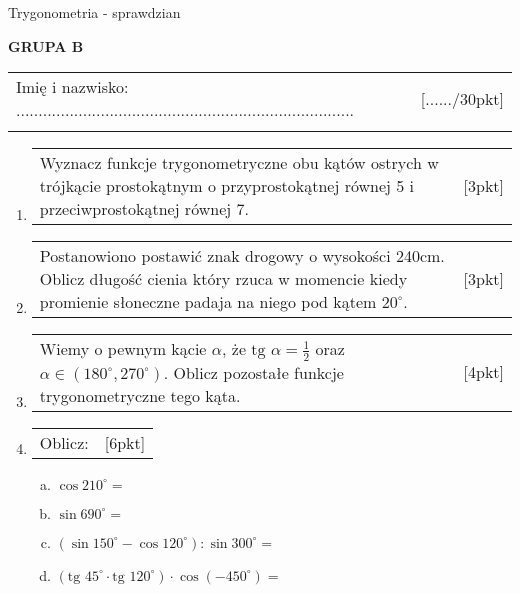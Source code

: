 \documentclass[12pt,a4paper]{article}
\begin{document}
	\begin{center}
		\LARGE Trygonometria - sprawdzian
	\end{center}
	\vspace{1.5cm}
	\begin{flushright}
		\textbf{GRUPA B}
	\end{flushright}
	\begin{tabular}{p{13cm} r}
		Imię i nazwisko: ............................................................................
		&[....../30pkt]\\ 
		\vspace{0.5cm}
	\end{tabular}
	\begin{enumerate}[1.]

		\item  \begin{tabular}{p{13cm} r}
			Wyznacz funkcje trygonometryczne obu kątów ostrych w trójkącie prostokątnym o przyprostokątnej równej 5 i przeciwprostokątnej równej 7. &[3pkt]\\ 
		\end{tabular}
	
		\item  \begin{tabular}{p{13cm} r}
			Postanowiono postawić znak drogowy o wysokości 240cm. Oblicz długość cienia który rzuca w momencie kiedy promienie słoneczne padaja na niego pod kątem $20^\circ$.
			&[3pkt]\\ 
		\end{tabular}
	
		\item \begin{tabular}{p{13cm} r}
			Wiemy o pewnym kącie $\alpha$, że $\text{tg } \alpha = \frac{1}{2}$ oraz $\alpha\in (180^\circ,270^\circ)$. Oblicz pozostałe funkcje trygonometryczne tego kąta.
			&[4pkt]\\
		\end{tabular}
	
		\item \begin{tabular}{p{13cm} r}
			Oblicz: &[6pkt]\\ 
		\end{tabular}
		\begin{enumerate}[a)]
			\item $\cos210^\circ=$
			\item $\sin 690^\circ= $
			\item $(\sin 150^\circ - \cos 120^\circ) : \sin300^\circ= $
			\item $(\text{tg }45^\circ \cdot \text{tg } 120^\circ) \cdot \cos (-450^\circ)=$
		\end{enumerate}
	

\end{enumerate}
\end{document}
